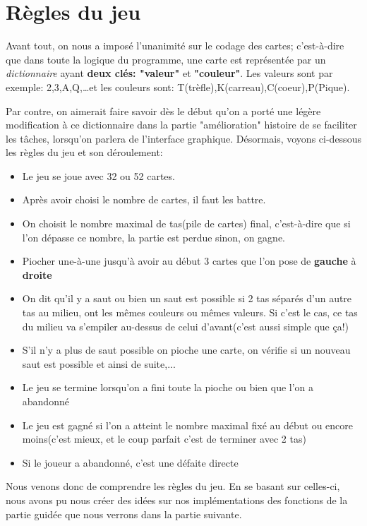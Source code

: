 \section{Règles du jeu}

\hspace{\parindent} Avant tout, on nous a imposé l'unanimité sur le codage des cartes; c'est-à-dire que dans toute la logique du programme, une carte est représentée par un \emph{dictionnaire} ayant \textbf{deux clés: "valeur"} et \textbf{"couleur"}. Les valeurs sont par exemple: 2,3,A,Q,\ldots et les couleurs sont:  T(trèfle),K(carreau),C(coeur),P(Pique).

\par Par contre, on aimerait faire savoir dès le début qu'on a porté une légère modification à ce dictionnaire dans la partie "amélioration" histoire de se faciliter les tâches, lorsqu'on parlera de l'interface graphique. Désormais, voyons ci-dessous les règles du jeu et son déroulement:
\\
\begin{itemize}
  \item Le jeu se joue avec 32 ou 52 cartes.
  \item Après avoir choisi le nombre de cartes, il faut les battre.
  \item On choisit le nombre maximal de tas(pile de cartes) final, c'est-à-dire que si l'on dépasse ce nombre, la partie est perdue sinon, on gagne.
  \item Piocher une-à-une jusqu'à avoir au début 3 cartes que l'on pose de \textbf{gauche} à \textbf{droite}
  \item On dit qu'il y a saut ou bien un saut est possible si 2 tas séparés d'un autre tas au milieu, ont les mêmes couleurs ou mêmes valeurs. Si c'est le cas, ce tas du milieu va s'empiler au-dessus de celui d'avant(c'est aussi simple que ça!)
  \item S'il n'y a plus de saut possible on pioche une carte, on vérifie si un nouveau saut est possible et ainsi de suite,...
  \item Le jeu se termine lorsqu'on a fini toute la pioche ou bien que l'on a abandonné
  \item Le jeu est gagné si l'on a atteint le nombre maximal fixé au début ou encore moins(c'est mieux, et le coup parfait c'est de terminer avec 2 tas)
  \item Si le joueur a abandonné, c'est une défaite directe \\
\end{itemize}
\par Nous venons donc de comprendre les règles du jeu. En se basant sur celles-ci, nous avons pu nous créer des idées sur nos implémentations des fonctions de la partie guidée que nous verrons dans la partie suivante.

